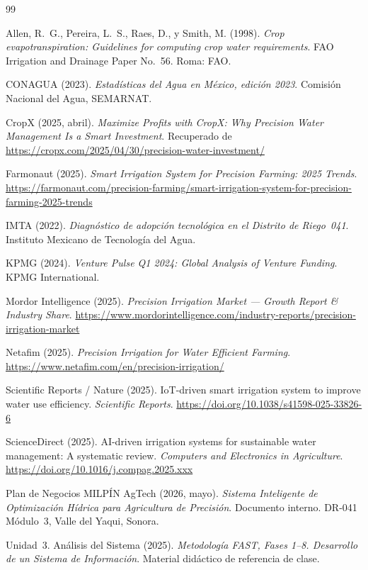 \documentclass[12pt,letterpaper]{article}
\begin{document}
\begin{thebibliography}{99}

Allen, R.~G., Pereira, L.~S., Raes, D., y Smith, M. (1998).
\textit{Crop evapotranspiration: Guidelines for computing crop water requirements}.
FAO Irrigation and Drainage Paper No.~56. Roma: FAO.

CONAGUA (2023).
\textit{Estadísticas del Agua en México, edición 2023}.
Comisión Nacional del Agua, SEMARNAT.

CropX (2025, abril).
\textit{Maximize Profits with CropX: Why Precision Water Management Is a Smart Investment}.
Recuperado de \url{https://cropx.com/2025/04/30/precision-water-investment/}

Farmonaut (2025).
\textit{Smart Irrigation System for Precision Farming: 2025 Trends}.
\url{https://farmonaut.com/precision-farming/smart-irrigation-system-for-precision-farming-2025-trends}

IMTA (2022).
\textit{Diagnóstico de adopción tecnológica en el Distrito de Riego~041}.
Instituto Mexicano de Tecnología del Agua.

KPMG (2024).
\textit{Venture Pulse Q1 2024: Global Analysis of Venture Funding}.
KPMG International.

Mordor Intelligence (2025).
\textit{Precision Irrigation Market — Growth Report \& Industry Share}.
\url{https://www.mordorintelligence.com/industry-reports/precision-irrigation-market}

Netafim (2025).
\textit{Precision Irrigation for Water Efficient Farming}.
\url{https://www.netafim.com/en/precision-irrigation/}

Scientific Reports / Nature (2025).
IoT-driven smart irrigation system to improve water use efficiency.
\textit{Scientific Reports}.
\url{https://doi.org/10.1038/s41598-025-33826-6}

ScienceDirect (2025).
AI-driven irrigation systems for sustainable water management: A systematic review.
\textit{Computers and Electronics in Agriculture}.
\url{https://doi.org/10.1016/j.compag.2025.xxx}

Plan de Negocios MILPÍN AgTech (2026, mayo).
\textit{Sistema Inteligente de Optimización Hídrica para Agricultura de Precisión}.
Documento interno. DR-041 Módulo~3, Valle del Yaqui, Sonora.

Unidad~3. Análisis del Sistema (2025).
\textit{Metodología FAST, Fases 1–8. Desarrollo de un Sistema de Información}.
Material didáctico de referencia de clase.

\end{thebibliography}
\end{document}
